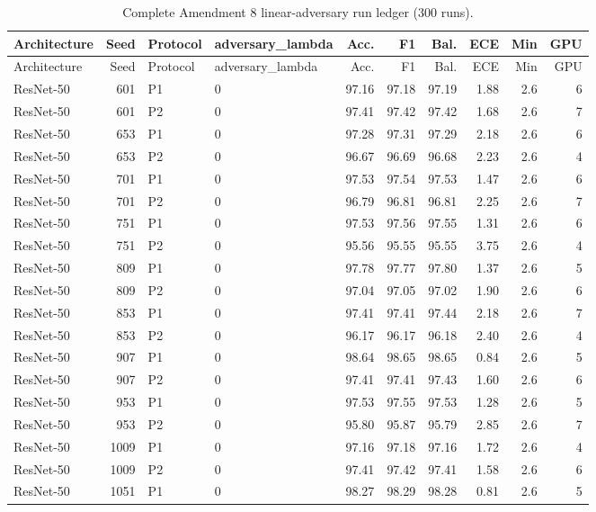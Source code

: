 {\scriptsize
\setlength{\tabcolsep}{3.5pt}
\begin{longtable}{lrllrrrrrr}
\caption{Complete Amendment 8 linear-adversary run ledger (300 runs).}\label{r:tab:ledger-linadv}\\
\toprule
Architecture & Seed & Protocol & adversary\_lambda & Acc. & F1 & Bal. & ECE & Min & GPU \\
\midrule
\endfirsthead
\toprule
Architecture & Seed & Protocol & adversary\_lambda & Acc. & F1 & Bal. & ECE & Min & GPU \\
\midrule
\endhead
\bottomrule
\endfoot
ResNet-50 & 601 & P1 & 0 & 97.16 & 97.18 & 97.19 & 1.88 & 2.6 & 6 \\
ResNet-50 & 601 & P2 & 0 & 97.41 & 97.42 & 97.42 & 1.68 & 2.6 & 7 \\
ResNet-50 & 653 & P1 & 0 & 97.28 & 97.31 & 97.29 & 2.18 & 2.6 & 6 \\
ResNet-50 & 653 & P2 & 0 & 96.67 & 96.69 & 96.68 & 2.23 & 2.6 & 4 \\
ResNet-50 & 701 & P1 & 0 & 97.53 & 97.54 & 97.53 & 1.47 & 2.6 & 6 \\
ResNet-50 & 701 & P2 & 0 & 96.79 & 96.81 & 96.81 & 2.25 & 2.6 & 7 \\
ResNet-50 & 751 & P1 & 0 & 97.53 & 97.56 & 97.55 & 1.31 & 2.6 & 6 \\
ResNet-50 & 751 & P2 & 0 & 95.56 & 95.55 & 95.55 & 3.75 & 2.6 & 4 \\
ResNet-50 & 809 & P1 & 0 & 97.78 & 97.77 & 97.80 & 1.37 & 2.6 & 5 \\
ResNet-50 & 809 & P2 & 0 & 97.04 & 97.05 & 97.02 & 1.90 & 2.6 & 6 \\
ResNet-50 & 853 & P1 & 0 & 97.41 & 97.41 & 97.44 & 2.18 & 2.6 & 7 \\
ResNet-50 & 853 & P2 & 0 & 96.17 & 96.17 & 96.18 & 2.40 & 2.6 & 4 \\
ResNet-50 & 907 & P1 & 0 & 98.64 & 98.65 & 98.65 & 0.84 & 2.6 & 5 \\
ResNet-50 & 907 & P2 & 0 & 97.41 & 97.41 & 97.43 & 1.60 & 2.6 & 6 \\
ResNet-50 & 953 & P1 & 0 & 97.53 & 97.55 & 97.53 & 1.28 & 2.6 & 5 \\
ResNet-50 & 953 & P2 & 0 & 95.80 & 95.87 & 95.79 & 2.85 & 2.6 & 7 \\
ResNet-50 & 1009 & P1 & 0 & 97.16 & 97.18 & 97.16 & 1.72 & 2.6 & 4 \\
ResNet-50 & 1009 & P2 & 0 & 97.41 & 97.42 & 97.41 & 1.58 & 2.6 & 6 \\
ResNet-50 & 1051 & P1 & 0 & 98.27 & 98.29 & 98.28 & 0.81 & 2.6 & 5 \\

\end{longtable}}

